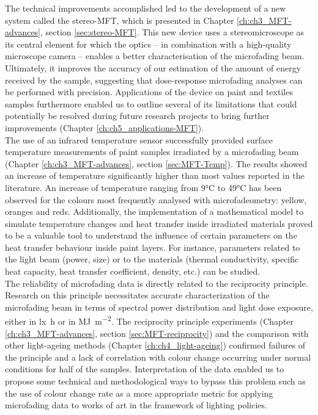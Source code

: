 The technical improvements accomplished led to the development of a new system called the stereo-MFT, which is presented in Chapter \ref{ch:ch3_MFT-advances}, section \ref{sec:stereo-MFT}. This new device uses a stereomicroscope as its central element for which the optics – in combination with a high-quality microscope camera – enables a better characterisation of the microfading beam. Ultimately, it improves the accuracy of our estimation of the amount of energy received by the sample, suggesting that dose-response microfading analyses can be performed with precision. Applications of the device on paint and textiles samples furthermore enabled us to outline several of its limitations that could potentially be resolved during future research projects to bring further improvements (Chapter \ref{ch:ch5_applications-MFT}). \\

The use of an infrared temperature sensor successfully provided surface temperature measurements of paint samples irradiated by a microfading beam (Chapter \ref{ch:ch3_MFT-advances}, section \ref{sec:MFT-Temp}). The results showed an increase of temperature significantly higher than most values reported in the literature. An increase of temperature ranging from 9\unit{\degreeCelsius} to 49\unit{\degreeCelsius} has been observed for the colours most frequently analysed with microfadeometry: yellow, oranges and reds. Additionally, the implementation of a mathematical model to simulate temperature changes and heat transfer inside irradiated materials proved to be a valuable tool to understand the influence of certain parameters on the heat transfer behaviour inside paint layers. For instance, parameters related to the light beam (power, size) or to the materials (thermal conductivity, specific heat capacity, heat transfer coefficient, density, etc.) can be studied. \\ 

The reliability of microfading data is directly related to the reciprocity principle. Research on this principle necessitates accurate characterization of the microfading beam in terms of spectral power distribution and light dose exposure, either in \unit{\lux\hour} or in \unit{\mega\joule\per\square\metre}. The reciprocity principle experiments (Chapter \ref{ch:ch3_MFT-advances}, section \ref{sec:MFT-reciprocity}) and the comparison with other light-ageing methods (Chapter \ref{ch:ch4_light-ageing}) confirmed failures of the principle and a lack of correlation with colour change occurring under normal conditions for half of the samples. Interpretation of the data enabled us to propose some technical and methodological ways to bypass this problem such as the use of colour change rate as a more appropriate metric for applying microfading data to works of art in the framework of lighting policies. \\

